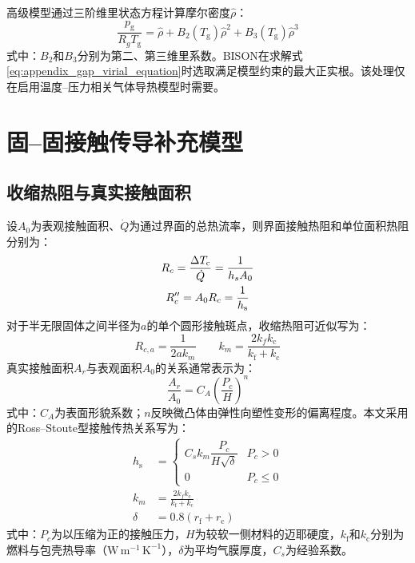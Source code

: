 高级模型通过三阶维里状态方程计算摩尔密度$\hat\rho$：
\begin{equation}
	\frac{p_{\mathrm g}}{R_gT_{\mathrm g}}
	=\hat\rho+B_2(T_{\mathrm g})\hat\rho^2+B_3(T_{\mathrm g})\hat\rho^3
	\label{eq:appendix_gap_virial_equation}
\end{equation}
\noindent 式中：$B_2$和$B_3$分别为第二、第三维里系数。BISON在求解式\eqref{eq:appendix_gap_virial_equation}时选取满足模型约束的最大正实根。该处理仅在启用温度--压力相关气体导热模型时需要。

\section{固--固接触传导补充模型}
\label{app:gap_contact_supplementary_models}

\subsection{收缩热阻与真实接触面积}

设$A_0$为表观接触面积、$\dot Q$为通过界面的总热流率，则界面接触热阻和单位面积热阻分别为：
\begin{gather}
	R_c=\frac{\Delta T_{\mathrm c}}{\dot Q}
	=\frac{1}{h_sA_0}
	\notag
	\\
	R_c''=A_0R_c=\frac{1}{h_{\mathrm s}}
	\label{eq:appendix_gap_contact_resistance}
\end{gather}
对于半无限固体之间半径为$a$的单个圆形接触斑点，收缩热阻可近似写为：
\begin{equation}
	R_{c,a}=\frac{1}{2ak_m}
	\qquad
	k_m=\frac{2k_fk_{\mathrm c}}{k_{\mathrm f}+k_{\mathrm c}}
	\label{eq:appendix_gap_single_spot_resistance}
\end{equation}
真实接触面积$A_r$与表观面积$A_0$的关系通常表示为：
\begin{equation}
	\frac{A_r}{A_0}
	=C_A\left(\frac{P_c}{H}\right)^n
	\label{eq:appendix_gap_real_contact_area}
\end{equation}
\noindent 式中：$C_A$为表面形貌系数；$n$反映微凸体由弹性向塑性变形的偏离程度。本文采用的Ross--Stoute型接触传热关系写为：
\begin{subequations}\label{eq:appendix_gap_solid_contact_model}
	\begin{align}
		h_{\mathrm s}
		&=
		\begin{cases}
			C_s k_m\dfrac{P_c}{H\sqrt{\delta}} & P_c>0\\[1.0ex]
			0 & P_c\leq0
		\end{cases}
		\label{eq:appendix_gap_solid_contact_conductance}\\
		k_m&=\frac{2k_fk_{\mathrm c}}{k_{\mathrm f}+k_{\mathrm c}}
		\label{eq:appendix_gap_effective_solid_conductivity}\\
		\delta&=0.8\left(r_{\mathrm f}+r_{\mathrm c}\right)
		\label{eq:appendix_gap_average_film_thickness}
	\end{align}
\end{subequations}
\noindent 式中：$P_c$为以压缩为正的接触压力，$H$为较软一侧材料的迈耶硬度，$k_{\mathrm f}$和$k_{\mathrm c}$分别为燃料与包壳热导率（$\mathrm{W\,m^{-1}\,K^{-1}}$），$\delta$为平均气膜厚度，$C_s$为经验系数。

